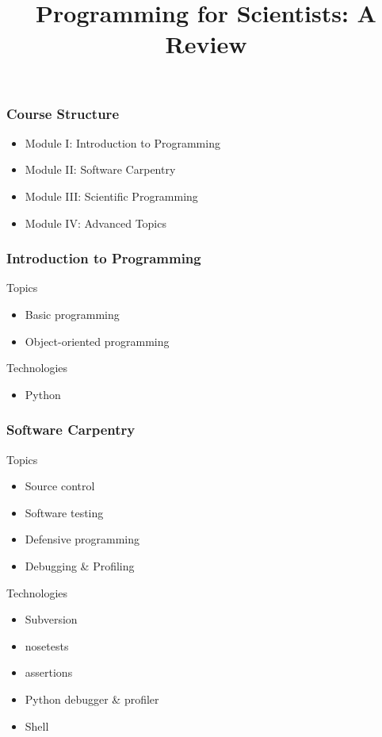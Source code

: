 
\title{Programming for Scientists: A Review}

\frame{\maketitle}

\begin{frame}[fragile]
\frametitle{Course Structure}
\begin{itemize}
\item Module I: Introduction to Programming
\item Module II: Software Carpentry
\item Module III: Scientific Programming
\item Module IV: Advanced Topics
\end{itemize}
\end{frame}

\begin{frame}[fragile]
\frametitle{Introduction to Programming}

\begin{block}{Topics}

\begin{itemize}
\item Basic programming
\item Object-oriented programming
\end{itemize}
\end{block}

\begin{block}{Technologies}
\begin{itemize}
\item Python
\end{itemize}
\end{block}
\end{frame}

\begin{frame}[fragile]
\frametitle{Software Carpentry}
\begin{block}{Topics}
\begin{itemize}
\item Source control
\item Software testing
\item Defensive programming
\item Debugging \& Profiling
\end{itemize}
\end{block}

\begin{block}{Technologies}
\begin{itemize}
\item Subversion
\item nosetests
\item assertions
\item Python debugger \& profiler
\item Shell
\end{itemize}
\end{block}
\end{frame}

